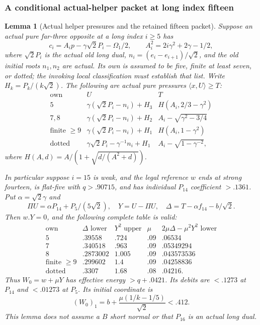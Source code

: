 \documentclass[11pt]{article}
\newtheorem{lemma}[theorem]{Lemma}
\theoremstyle{definition}
\theoremstyle{remark}
\newcommand{\ip}[2]{\langle #1,#2\rangle}
\begin{document}
\subsubsection{A conditional actual-helper packet at long index fifteen}
\begin{lemma}[Actual helper pressures and the retained fifteen packet]
\label{lem:I-helper15-pressure-packet}
Suppose an actual pure far-three opposite at a long index \(i\ge5\)
has
\[
 c_i=A_i p-\gamma\sqrt2P_i-\Omega_1/2,\qquad
 A_i^2=2i\gamma^2+2\gamma-1/2,
\]
where \(\sqrt2P_i\) is the actual old long dual,
\(n_i=(e_i-e_{i+1})/\sqrt2\), and the old initial roots
\(n_1,n_2\) are actual. Its own is assumed to be five, finite at
least seven, or dotted; the invoking local classification must establish
that list. Write \(H_k=P_k/(k\sqrt2)\).
The following are actual pure pressures \(\ip xU\ge T\):
\[
\begin{array}{c|c|c}
\text{own}&U&T\\ \hline
5&\gamma(\sqrt2P_i-n_i)+H_3&H(A_i,2/3-\gamma^2)\\
7,8&\gamma(\sqrt2P_i-n_i)+H_2&A_i-\sqrt{\gamma^2-3/4}\\
\text{finite }\ge9&\gamma(\sqrt2P_i-n_i)+H_1&H(A_i,1-\gamma^2)\\
\text{dotted}&\gamma\sqrt2P_i-\gamma^{-1}n_i+H_1&A_i-\sqrt{1-\gamma^{-2}},
\end{array}
\]
where \(H(A,d)=A/(1+\sqrt{d/(A^2+d)})\).

In particular suppose \(i=15\) is weak, and the legal reference \(w\)
ends at strong fourteen, is flat-five with \(q>.90715\), and has
individual \(P_{14}\) coefficient \(>.1361\).
Put \(\alpha=\sqrt2\gamma\) and
\[
 \Pi U=\alpha P_{14}+P_5/(5\sqrt2),\quad
 Y=U-\Pi U,\quad \Delta=T-\alpha f_{14}-b/\sqrt2.
\]
Then \(w.Y=0\), and the following complete table is valid:
\[
\begin{array}{c|c|c|c|c}
\text{own}&\Delta\text{ lower}&Y^2\text{ upper}&\mu&
 2\mu\Delta-\mu^2Y^2\text{ lower}\\ \hline
5&.39558&.724&.09&.06534\\
7&.340518&.963&.09&.05349294\\
8&.2873002&1.005&.09&.043573536\\
\text{finite }\ge9&.299602&1.4&.09&.04258836\\
\text{dotted}&.3307&1.68&.08&.04216 .
\end{array}
\]
Thus \(W_0=w+\mu Y\) has effective energy \(>q+.0421\).
Its debits are \(<.1273\) at \(P_{14}\) and \(<.01273\) at \(P_5\).
Its initial coordinate is
\[
 (W_0)_1=b+{\frac{\mu(1/k-1/5)}{\sqrt2}}<.412.
\]
This lemma does not assume a \(B\) short normal or that \(P_{16}\)
is an actual long dual.
\end{lemma}
\end{document}

